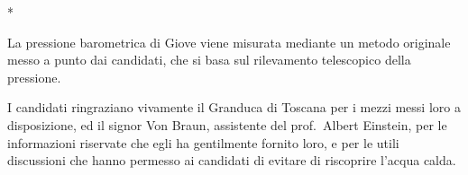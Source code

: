 \documentclass[%
corpo=12pt,
twoside,
tipotesi=magistrale,
]{toptesi}
\begin{document}
\newtheorem{osservazione}{Osservazione}%



\begin{ThesisTitlePage}*
% 
% 
% 

%
\end{ThesisTitlePage}


\sommario%

La pressione barometrica di Giove viene misurata
mediante un metodo originale  messo a punto dai candidati, che si basa
sul rilevamento telescopico della pressione.

\ringraziamenti%

I candidati ringraziano vivamente il Granduca di Toscana per i mezzi
messi loro a disposizione, ed il signor Von Braun, assistente del
prof.~Albert Einstein, per le informazioni riservate che egli ha
gentilmente fornito loro, e per le utili discussioni che hanno permesso ai candidati di evitare di riscoprire l'acqua calda.
\end{document}
